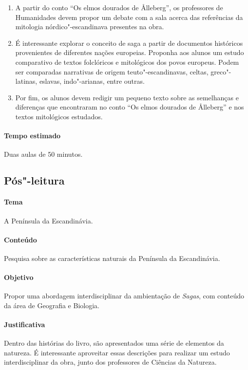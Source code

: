 \documentclass[12pt]{extarticle}
\begin{document}
\begin{enumerate}

\item A partir do conto ``Os elmos dourados de Ålleberg'',
os professores de Humanidades devem propor um debate com a sala
acerca das referências da mitologia nórdico"-escandinava presentes
na obra.

\item É interessante explorar o conceito de saga a
partir de documentos históricos provenientes de diferentes nações
europeias. Proponha aos alunos um estudo
comparativo de textos folclóricos e mitológicos dos povos europeus. 
Podem ser comparadas narrativas de origem teuto"-escandinavas,
celtas, greco"-latinas, eslavas, indo"-arianas, entre outras.

\item Por fim, os alunos devem redigir um pequeno texto
sobre as semelhanças e diferenças que encontraram no conto ``Os elmos dourados de Ålleberg''
e nos textos mitológicos estudados.

\end{enumerate}


\paragraph{Tempo estimado} Duas aulas de 50 minutos.

 
\subsection{Pós"-leitura}

\paragraph{Tema} A Península da Escandinávia.

\paragraph{Conteúdo} Pesquisa sobre as características naturais da Península da
Escandinávia.

\paragraph{Objetivo} Propor uma abordagem interdisciplinar da ambientação de \emph{Sagas},
com conteúdo da área de Geografia e Biologia.

\paragraph{Justificativa} Dentro das histórias do livro, são apresentados uma série de elementos da
natureza. É interessante aproveitar essas descrições para realizar um estudo 
interdisciplinar da obra, junto dos professores de Ciências da Natureza. 
\end{document}

